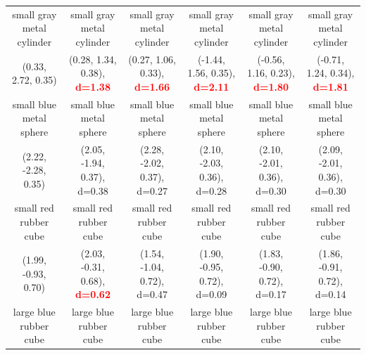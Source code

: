 \documentclass{article}
\begin{document}
\begin{table}[ht!]
{\begin{tabular}{cccccc}
  small gray metal cylinder &                                                                                small gray metal cylinder &                                                      small gray metal cylinder &                               small gray metal cylinder &                               small gray metal cylinder &                              small gray metal cylinder \\
         (0.33, 2.72, 0.35) &                                                     (0.28, 1.34, 0.38), \textcolor{red}{\textbf{d=1.38}} &                           (0.27, 1.06, 0.33), \textcolor{red}{\textbf{d=1.66}} &   (-1.44, 1.56, 0.35), \textcolor{red}{\textbf{d=2.11}} &   (-0.56, 1.16, 0.23), \textcolor{red}{\textbf{d=1.80}} &  (-0.71, 1.24, 0.34), \textcolor{red}{\textbf{d=1.81}} \\
    small blue metal sphere &                                                                                  small blue metal sphere &                                                        small blue metal sphere &                                 small blue metal sphere &                                 small blue metal sphere &                                small blue metal sphere \\
        (2.22, -2.28, 0.35) &                                                                              (2.05, -1.94, 0.37), d=0.38 &                                                    (2.28, -2.02, 0.37), d=0.27 &                             (2.10, -2.03, 0.36), d=0.28 &                             (2.10, -2.01, 0.36), d=0.30 &                            (2.09, -2.01, 0.36), d=0.30 \\
      small red rubber cube &                                                                                    small red rubber cube &                                                          small red rubber cube &                                   small red rubber cube &                                   small red rubber cube &                                  small red rubber cube \\
        (1.99, -0.93, 0.70) &                                                    (2.03, -0.31, 0.68), \textcolor{red}{\textbf{d=0.62}} &                                                    (1.54, -1.04, 0.72), d=0.47 &                             (1.90, -0.95, 0.72), d=0.09 &                             (1.83, -0.90, 0.72), d=0.17 &                            (1.86, -0.91, 0.72), d=0.14 \\
     large blue rubber cube &                                                                                   large blue rubber cube &                                                         large blue rubber cube &                                  large blue rubber cube &                                  large blue rubber cube &                                 large blue rubber cube \\

\end{tabular}}
\end{table}
\end{document}
